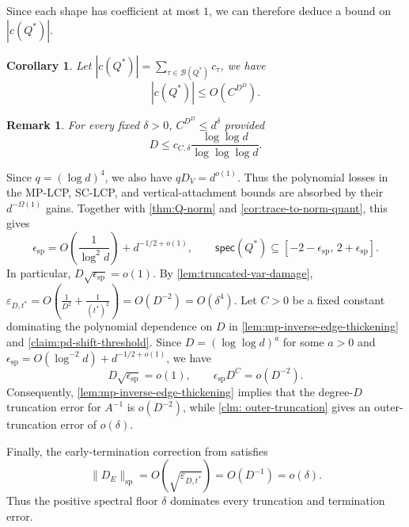 \documentclass[12pt]{article}
\def \eps {\epsilon}
\newtheorem{corollary}[theorem]{Corollary}
\newtheorem{remark}[theorem]{Remark}
\newcommand{\calB}{\mathcal{B}}
\begin{document}
Since each shape has coefficient at most $1$, we can therefore deduce a bound on $|c(Q^*)|$.
\begin{corollary}
	Let $|c(Q^*)| = \sum_{\tau \in \calB(Q^*)} c_\tau $, we have \[ 
	|c(Q^*)|  \leq O(C^{D^D}).
	\]
\end{corollary}

\begin{remark}
For every fixed \(\delta>0\), \(C^{D^D}\leq d^\delta\) provided
\[
    D\leq c_{C,\delta}
    \frac{\log\log d}{\log\log\log d}.
\]
\end{remark}


Since \(q=(\log d)^4\), we also have \(qD_V=d^{o(1)}\).
Thus the polynomial losses in the MP-LCP, SC-LCP, and
vertical-attachment bounds are absorbed by their \(d^{-\Omega(1)}\)
gains. Together with \cref{thm:Q-norm} and
\cref{cor:trace-to-norm-quant}, this gives
\[
    \eps_{\mathrm{sp}}
    =
    O\!\left(\frac1{\log^2 d}\right)+d^{-1/2+o(1)},
    \qquad
    \mathsf{spec}(Q^\ast)
    \subseteq
    [-2-\eps_{\mathrm{sp}},\,2+\eps_{\mathrm{sp}}].
\]
In particular, \(D\sqrt{\eps_{\mathrm{sp}}}=o(1)\).
 By \cref{lem:truncated-var-damage},
\(
    \varepsilon_{D,t^\ast}
    =
    O\!\left(\frac1{D^2}+\frac1{(t^\ast)^2}\right)
    =
    O(D^{-2})
    =
    O(\delta^4).
\)
Let \(C>0\) be a fixed constant dominating the polynomial dependence on
\(D\) in \cref{lem:mp-inverse-edge-thickening} and
\cref{claim:pd-shift-threshold}. Since \(D=(\log \log d)^a\) for some $a>0$  and
\(\eps_{\mathrm{sp}}=O(\log^{-2}d)+d^{-1/2+o(1)}\), we have
\[
    D\sqrt{\eps_{\mathrm{sp}}}=o(1),
    \qquad
    \eps_{\mathrm{sp}}D^C=o(D^{-2}).
\]
Consequently, \cref{lem:mp-inverse-edge-thickening} implies
that the degree-\(D\) truncation error for \(A^{-1}\) is \(o(D^{-2})\),
while \cref{clm: outer-truncation} gives an outer-truncation error of
\(o(\delta)\).

Finally, the early-termination correction from
 satisfies
\[
    \|D_E\|_{\mathrm{sp}}
    =
    O\!\left(\sqrt{\varepsilon_{D,t^\ast}}\right)
    =
    O(D^{-1})
    =
    o(\delta).
\]
Thus the positive spectral floor \(\delta\) dominates every truncation
and termination error.
\end{document}

